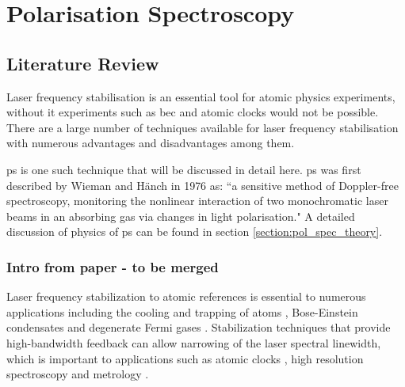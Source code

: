 \chapter{Polarisation Spectroscopy}
\setcounter{page}{1}

\section{Literature Review}

Laser frequency stabilisation is an essential tool for atomic physics experiments, without it experiments such as \gls{bec} and atomic clocks would not be possible.
There are a large number of techniques available for laser frequency stabilisation with numerous advantages and disadvantages among them.

\Gls{ps} is one such technique that will be discussed in detail here.
\Gls{ps} was first described by Wieman and H\"anch in 1976 as: ``a sensitive method of Doppler-free spectroscopy, monitoring the nonlinear interaction of two monochromatic laser beams in an absorbing gas via changes in light polarisation."\cite{wieman_doppler-free_1976}
A detailed discussion of physics of \gls{ps} can be found in section \ref{section:pol_spec_theory}.

\subsection{Intro from paper - to be merged}
Laser frequency stabilization to atomic references is essential to numerous applications including the cooling and trapping of atoms \cite{uetake_high_2008, ye_stable_2010, akamatsu_narrow_2012}, Bose-Einstein condensates \cite{anderson_observation_1995} and degenerate Fermi gases \cite{demarco_onset_1999}. Stabilization techniques that provide high-bandwidth feedback can allow narrowing of the laser spectral linewidth, which is important to applications such as atomic clocks \cite{ludlow_sr_2008}, high resolution spectroscopy \cite{rafac_sub-dekahertz_2000} and metrology \cite{metcalf_laser_1999, ye_quantum_2008, demtroder_laser_2003}.

